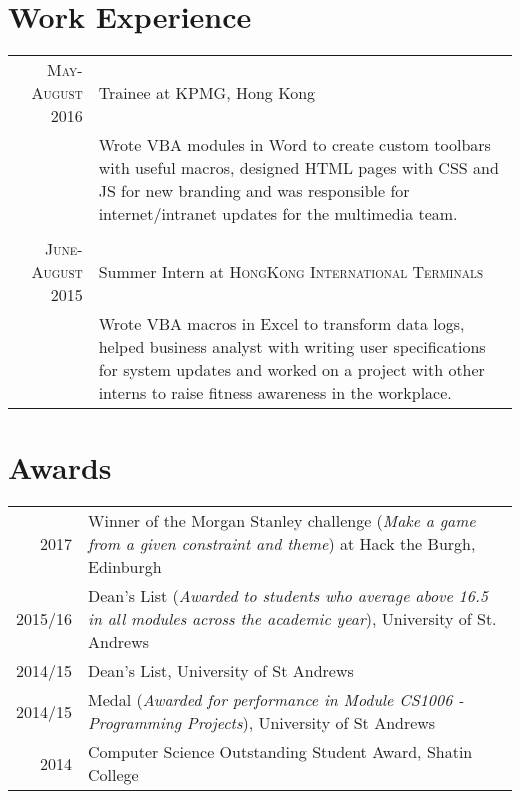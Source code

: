 \documentclass{article}
\begin{document}
\section*{Work Experience}
\begin{tabular}{r|p{15cm}}

\textsc{May-August 2016} & Trainee at \textsc{KPMG}, Hong Kong \\
 
&\footnotesize{Wrote VBA modules in Word to create custom toolbars with useful macros, designed HTML pages with CSS and JS for new branding and was responsible for internet/intranet updates for the multimedia team.}\\\multicolumn{2}{c}{} \\


\textsc{June-August 2015} & Summer Intern at \textsc{HongKong International Terminals} \\

&\footnotesize{Wrote VBA macros in Excel to transform data logs, helped business analyst with writing user specifications for system updates and worked on a project with other interns to raise fitness awareness in the workplace.}\\
\end{tabular}

\section*{Awards}
\begin{tabular}{r|p{17cm}}
\textsc{2017} & Winner of the Morgan Stanley challenge (\textit{Make a game from a given constraint and theme}) at Hack the Burgh, Edinburgh\\
\textsc{2015/16} & Dean's List (\textit{Awarded to students who average above 16.5 in all modules across the academic year}), University of St. Andrews \\

\textsc{2014/15} & Dean’s List, University of St Andrews\\

\textsc{2014/15} & Medal (\textit{Awarded for performance in Module CS1006 - Programming Projects}), University of St Andrews\\

\textsc{2014} & Computer Science Outstanding Student Award, Shatin College \\

\end{tabular}
\end{document}
